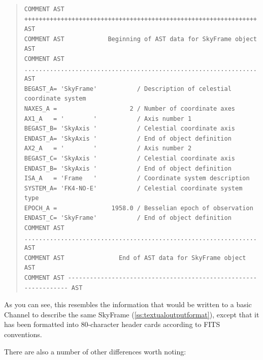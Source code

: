 \documentclass[twoside,11pt]{article}
\newcommand{\secref}[1]{\S\ref{#1}}
\renewcommand{\secref}[1]{\ref{#1}}
\begin{document}
\begin{quote}
\small
\begin{verbatim}
COMMENT AST ++++++++++++++++++++++++++++++++++++++++++++++++++++++++++++++++ AST
COMMENT AST            Beginning of AST data for SkyFrame object             AST
COMMENT AST ................................................................ AST
BEGAST_A= 'SkyFrame'           / Description of celestial coordinate system     
NAXES_A =                    2 / Number of coordinate axes                      
AX1_A   = '        '           / Axis number 1                                  
BEGAST_B= 'SkyAxis '           / Celestial coordinate axis                      
ENDAST_A= 'SkyAxis '           / End of object definition                       
AX2_A   = '        '           / Axis number 2                                  
BEGAST_C= 'SkyAxis '           / Celestial coordinate axis                      
ENDAST_B= 'SkyAxis '           / End of object definition                       
ISA_A   = 'Frame   '           / Coordinate system description                  
SYSTEM_A= 'FK4-NO-E'           / Celestial coordinate system type               
EPOCH_A =               1958.0 / Besselian epoch of observation                 
ENDAST_C= 'SkyFrame'           / End of object definition                       
COMMENT AST ................................................................ AST
COMMENT AST               End of AST data for SkyFrame object                AST
COMMENT AST ---------------------------------------------------------------- AST
\end{verbatim}
\normalsize
\end{quote}

As you can see, this resembles the information that would be written
to a basic Channel to describe the same SkyFrame
(\secref{ss:textualoutputformat}), except that it has been formatted
into 80-character header cards according to FITS conventions.

There are also a number of other differences worth noting:
\end{document}
